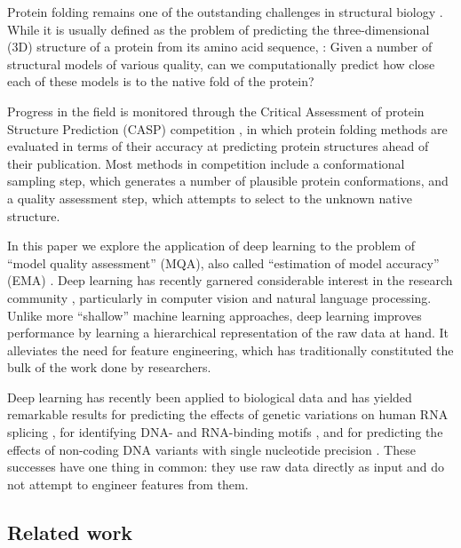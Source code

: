 
Protein folding remains one of the outstanding challenges in
structural biology \cite{dill2012folding}. While it is usually defined
as the problem of predicting the three-dimensional (3D) structure of a
protein from its amino acid sequence, : Given a number of structural models of various quality, can
we computationally predict how close each of these models is to the
native fold of the protein?

Progress in the field is monitored through the Critical Assessment of
protein Structure Prediction (CASP) competition \cite{moult1995large},
in which protein folding methods are evaluated in terms of their
accuracy at predicting protein structures ahead of their
publication. Most methods in competition include a conformational
sampling step, which generates a number of plausible protein
conformations, and a quality assessment step, which attempts to select
 to the unknown native structure.

In this paper we explore the application of deep learning to the
problem of ``model quality assessment'' (MQA), also called
``estimation of model accuracy'' (EMA) \cite{kryshtafovych2015}. Deep
learning has recently garnered considerable interest in the research
community \cite{lecun2015deep}, particularly in computer vision and
natural language processing. Unlike more ``shallow'' machine learning
approaches, deep learning improves performance by learning a
hierarchical representation of the raw data at hand. It alleviates the
need for feature engineering, which has traditionally constituted the
bulk of the work done by researchers.

Deep learning has recently been applied to biological data and has
yielded remarkable results for predicting the effects of genetic
variations on human RNA splicing \cite{xiong2015human}, for
identifying DNA- and RNA-binding
motifs \cite{alipanahi2015predicting}, and for predicting the effects
of non-coding DNA variants with single nucleotide
precision \cite{zhou2015predicting}. These successes have one thing in
common: they use raw data directly as input and do not attempt to
engineer features from them.

\subsection{Related work}

